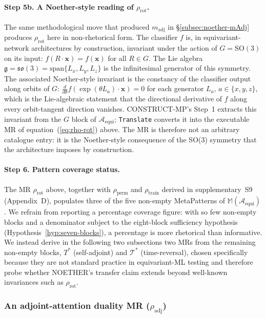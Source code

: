 \documentclass[acmsmall, screen]{acmart}
\begin{document}
\paragraph{Step 5b. A Noether-style reading of $\rho_{\mathrm{rot}}$.}
The same methodological move that produced $m_{\mathrm{adj}}$ in \S\ref{subsec:noether-mAdj} produces $\rho_{\mathrm{rot}}$ here in non-rhetorical form. The classifier $f$ is, in equivariant-network architectures by construction, invariant under the action of $G = \mathrm{SO}(3)$ on its input: $f(R \cdot \mathbf{x}) = f(\mathbf{x})$ for all $R \in G$. The Lie algebra $\mathfrak{g} = \mathfrak{so}(3) = \mathrm{span}\{L_x, L_y, L_z\}$ is the infinitesimal generator of this symmetry. The associated Noether-style invariant is the constancy of the classifier output along orbits of $G$: $\frac{d}{d\theta} f(\exp(\theta L_a) \cdot \mathbf{x}) = 0$ for each generator $L_a$, $a \in \{x,y,z\}$, which is the Lie-algebraic statement that the directional derivative of $f$ along every orbit-tangent direction vanishes. CONSTRUCT-MP's Step~1 extracts this invariant from the $G$ block of $\mathcal{A}_{\mathrm{equi}}$; \texttt{Translate} converts it into the executable MR of equation~(\ref{eq:rho-rot}) above. The MR is therefore not an arbitrary catalogue entry: it is the Noether-style consequence of the SO(3) symmetry that the architecture imposes by construction.

\paragraph{Step 6. Pattern coverage status.} The MR $\rho_{\mathrm{rot}}$ above, together with $\rho_{\mathrm{perm}}$ and $\rho_{\mathrm{train}}$ derived in supplementary~S9 (Appendix~D), populates three of the five non-empty MetaPatterns of $\mathbb{M}(\mathcal{A}_{\mathrm{equi}})$. We refrain from reporting a percentage coverage figure: with so few non-empty blocks and a denominator subject to the eight-block sufficiency hypothesis (Hypothesis~\ref{hyp:seven-blocks}), a percentage is more rhetorical than informative. We instead derive in the following two subsections two MRs from the remaining non-empty blocks, $T^{*}$ (self-adjoint) and $\mathcal{T}^{*}$ (time-reversal), chosen specifically because they are not standard practice in equivariant-ML testing and therefore probe whether NOETHER's transfer claim extends beyond well-known invariances such as $\rho_{\mathrm{rot}}$.

\subsubsection{An adjoint-attention duality MR (\texorpdfstring{$\rho_{\mathrm{adj}}$}{rho\_adj})}
\label{subsec:rho-adj}
\end{document}
